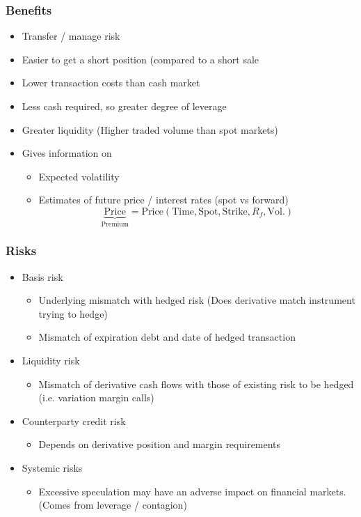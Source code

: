 \documentclass[../notes_compiled.tex]{subfiles}
\begin{document}
\subsubsection*{Benefits}
\begin{itemize}
\item Transfer / manage risk
\item Easier to get a short position (compared to a short sale
\item Lower transaction costs than cash market
\item Less cash required, so greater degree of leverage
\item Greater liquidity (Higher traded volume than spot markets)
\item Gives information on
\begin{itemize}
\item Expected volatility
\item Estimates of future price / interest rates (spot vs forward)
\begin{equation}
\underbrace{\text{Price}}_{\text{Premium}} = \text{Price}(\text{Time}, \text{Spot}, \text{Strike}, R_{f}, \text{Vol.})
\end{equation}
\end{itemize}
\end{itemize}


\subsubsection*{Risks}
\begin{itemize}
\item Basis risk
\begin{itemize}
\item Underlying mismatch with hedged risk (Does derivative match instrument trying to hedge)
\item Mismatch of expiration debt and date of hedged transaction
\end{itemize}

\item Liquidity risk
\begin{itemize}
\item Mismatch of derivative cash flows with those of existing risk to be hedged (i.e. variation margin calls)
\end{itemize}

\item Counterparty credit risk
\begin{itemize}
\item Depends on derivative position and margin requirements
\end{itemize}

\item Systemic risks
\begin{itemize}
\item Excessive speculation may have an adverse impact on financial markets. (Comes from leverage / contagion)
\end{itemize}

\end{itemize}
\end{document}
